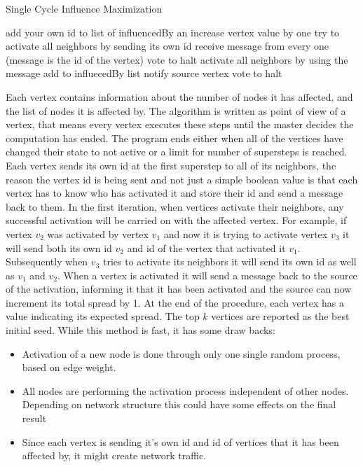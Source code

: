 \documentclass[english]{tktltiki}
\begin{document}
\begin{algorithm}[ht!]
\caption{Single Cycle Influence Maximization}
\label{alg:singleccycleIM}
\begin{algorithmic}
	\State add your own id to list of influencedBy an increase vertex value by one
	\State try to activate all neighbors by sending its own id
\Else
	\State receive message from every one (message is the id of the vertex)
			\State vote to halt
		\Else
			\State activate all neighbors by using the message
			\State add to influecedBy list
			\State notify source vertex
			\State vote to halt
		\EndIf	
	\EndFor
\EndIf
\end{algorithmic}
\end{algorithm}
Each vertex contains information about the number of nodes it has affected, and the list of nodes it is affected by. 
The algorithm is written as point of view of a vertex, that means every vertex executes these steps until the master decides the computation has ended. 
The program ends either when all of the vertices have changed their state to not active or a limit for number of supersteps is reached. 
Each vertex sends its own id at the first superstep to all of its neighbors, the reason the vertex id is being sent and not just a simple boolean value is that each vertex has to know who has activated it and store their id and send a message back to them. 
In the first iteration, when vertices activate their neighbors, any successful activation will be carried on with the affected vertex. 
For example, if vertex $v_2$ was activated by vertex $v_1$ and now it is trying to activate vertex $v_3$ it will send both its own id $v_2$ and id of the vertex that activated it $v_1$. 
Subsequently when $v_3$ tries to activate its neighbors it will send its own id as well as $v_1$ and $v_2$. 
When a vertex is activated it will send a message back to the source of the activation, informing it that it has been activated and the source can now increment its total spread by 1. 
At the end of the procedure, each vertex has a value indicating its expected spread. 
The top $k$ vertices are reported as the best initial seed. 
While this method is fast, it has some draw backs:
\begin{itemize}
\item Activation of a new node is done through only one single random process, based on edge weight.
\item All nodes are performing the activation process independent of other nodes. 
Depending on network structure this could have some effects on the final result
\item Since each vertex is sending it's own id and id of vertices that it has been affected by, it might create network traffic.
\end{itemize}
\end{document}
